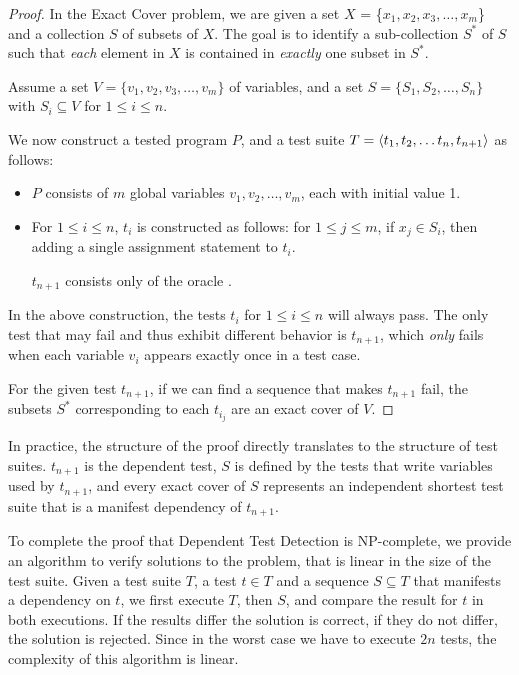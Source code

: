 \begin{proof}
In the Exact Cover problem,
we are given a set $X$ = \{$x_1, x_2, x_3, \dots, x_m$\} and a collection $S$ of subsets of $X$.
The goal is to identify a sub-collection $S^*$ of $S$ such that \textit{each}
element in $X$ is contained in \textit{exactly} one subset in $S^*$.  

Assume a set $V = \{v_1, v_2, v_3, \dots, v_m\}$ of variables,
and a set $S = \{S_1, S_2, \dots, S_n\}$ with $S_i \subseteq V$ for $ 1\leq i
\leq n$. 

We now construct a tested program $P$, and a test suite
$T =  \langle t_1, t_2, \dots t_n , t_{n+1} \rangle $ as follows:

\begin{itemize}

\item $P$ consists of $m$ global variables 
$v_1, v_2,\dots, v_m$, each with initial value 1.

\item 
For $1 \le i \le n$, $t_i$ is constructed as follows:
for $1 \le j \le m$, if $x_j \in S_i$, then adding a
single assignment statement  to $t_i$.

$t_{n+1}$ consists only of the oracle
.

\end{itemize}

In the above construction, the tests $t_i$ for $1 \le i \le n$ 
will always pass. The only
test that may fail and thus exhibit different behavior is $t_{n+1}$, which 
\emph{only} fails when each variable $v_i$ appears exactly
once in a test case.

For the given test $t_{n+1}$, if we can
find a sequence 
that makes $t_{n+1}$ fail, the subsets $S^*$ corresponding
to each $t_{i_j}$ are an exact cover of $V$.
\end{proof}

In practice, the structure of the proof directly translates to the
structure of test suites. $t_{n+1}$ is the dependent test, $S$ is
defined by the tests that write variables used by $t_{n+1}$, and every
exact cover of $S$ represents an independent shortest test suite that
is a manifest dependency of $t_{n+1}$.

To complete the proof that Dependent Test Detection is NP-complete, we
provide an algorithm to verify solutions to the problem, that is
linear in the size of the test suite.
Given a test suite $T$, a test $t \in T$ and a sequence
$S \subseteq T$ that manifests a dependency on $t$, we first execute $T$, then $S$, and
compare the result for $t$ in both executions. 
If the results differ the solution is correct, if they do not differ,
the solution is rejected.
Since in the worst case we have to execute $2n$ tests, the complexity
of this algorithm is linear. 



